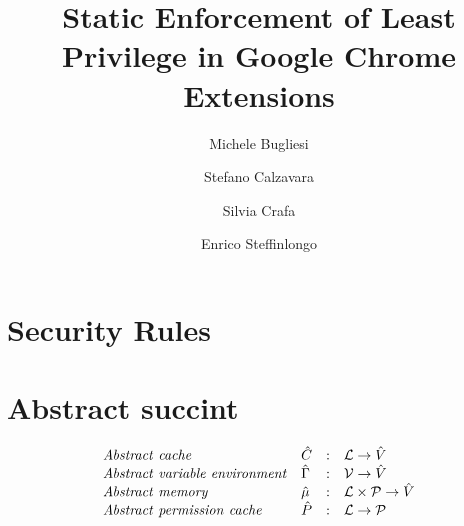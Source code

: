 \documentclass[[12pt,a4paper,twoside,openrigh]{article}
\author{Michele Bugliesi \and Stefano Calzavara \and Silvia Crafa \and Enrico Steffinlongo}
\title{Static Enforcement of Least Privilege in Google Chrome Extensions}
\newcommand{\Cat}[0]{\hat{C}}
\newcommand{\Env}[0]{\hat{\Gamma}}
\newcommand{\Pat}[0]{\hat{P}}
\begin{document}
\maketitle
\tableofcontents

\section{Security Rules}
\section{Abstract succint}

\[
\begin{array}{llcl}
\mathit{Abstract\ cache} & \Cat & : & \labs \rightarrow \absvalues \\
\mathit{Abstract\ variable\ environment} & \Env & : & \vars \rightarrow \absvalues \\
\mathit{Abstract\ memory} & \absmem & : & \labs \times \perms \rightarrow \absvalues \\
\mathit{Abstract\ permission\ cache} & \Pat & : & \labs \rightarrow \perms \\
\end{array}
\]
\end{document}
